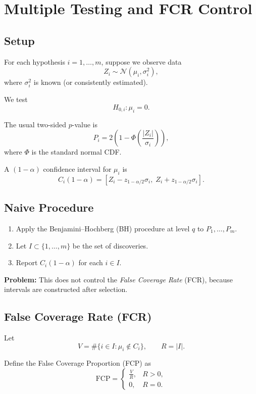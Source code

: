 \documentclass{article}
\begin{document}
\section*{Multiple Testing and FCR Control}

\subsection*{Setup}

For each hypothesis $i = 1,\dots,m$, suppose we observe data
\[
Z_i \sim \mathcal{N}(\mu_i, \sigma_i^2),
\]
where $\sigma_i^2$ is known (or consistently estimated).

We test
\[
H_{0,i}: \mu_i = 0.
\]

The usual two-sided $p$-value is
\[
P_i = 2\left(1 - \Phi\left(\frac{|Z_i|}{\sigma_i}\right)\right),
\]
where $\Phi$ is the standard normal CDF.

A $(1-\alpha)$ confidence interval for $\mu_i$ is
\[
C_i(1-\alpha)
=
\left[
Z_i - z_{1-\alpha/2}\sigma_i,
\;
Z_i + z_{1-\alpha/2}\sigma_i
\right].
\]

\subsection*{Naive Procedure}

\begin{enumerate}
\item Apply the Benjamini–Hochberg (BH) procedure at level $q$ to $P_1,\dots,P_m$.
\item Let $I \subset \{1,\dots,m\}$ be the set of discoveries.
\item Report $C_i(1-\alpha)$ for each $i \in I$.
\end{enumerate}

\textbf{Problem:} This does not control the \emph{False Coverage Rate} (FCR), because intervals are constructed after selection.

\subsection*{False Coverage Rate (FCR)}

Let
\[
V = \#\{ i \in I : \mu_i \notin C_i \},
\qquad
R = |I|.
\]

Define the False Coverage Proportion (FCP) as
\[
\mathrm{FCP} =
\begin{cases}
\frac{V}{R}, & R > 0, \\
0, & R = 0.
\end{cases}
\]
\end{document}
